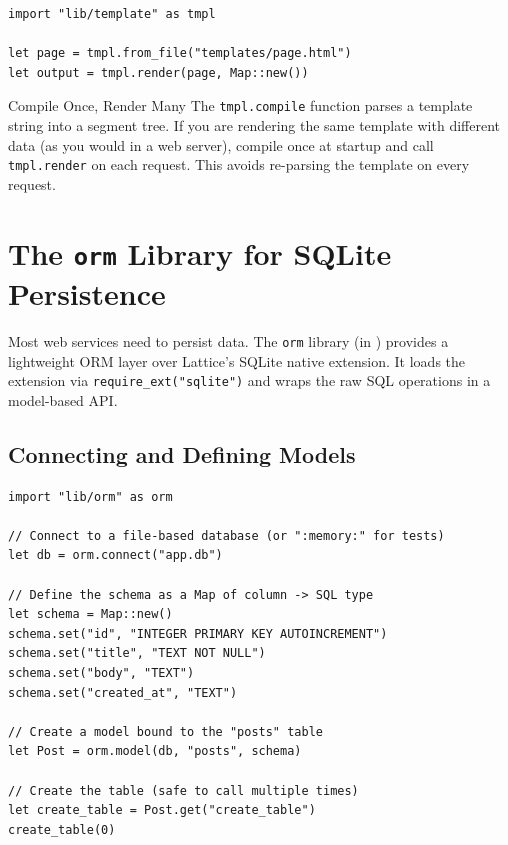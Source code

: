 \begin{lstlisting}[language=Lattice, caption={Rendering an inherited template}]
import "lib/template" as tmpl

let page = tmpl.from_file("templates/page.html")
let output = tmpl.render(page, Map::new())
\end{lstlisting}

\begin{tipbox}{Compile Once, Render Many}
The \lstinline|tmpl.compile| function parses a template string into a segment tree.
If you are rendering the same template with different data (as you would in a web server), compile once at startup and call \lstinline|tmpl.render| on each request.
This avoids re-parsing the template on every request.
\end{tipbox}

\section{The \texttt{orm} Library for SQLite Persistence}\label{sec:orm-library}


Most web services need to persist data.
The \lstinline|orm| library (in ) provides a lightweight ORM layer over Lattice's SQLite native extension.
It loads the extension via \lstinline|require_ext("sqlite")| and wraps the raw SQL operations in a model-based API.

\subsection{Connecting and Defining Models}\label{sec:orm-connect}

\begin{lstlisting}[language=Lattice, caption={Setting up a database and model}]
import "lib/orm" as orm

// Connect to a file-based database (or ":memory:" for tests)
let db = orm.connect("app.db")

// Define the schema as a Map of column -> SQL type
let schema = Map::new()
schema.set("id", "INTEGER PRIMARY KEY AUTOINCREMENT")
schema.set("title", "TEXT NOT NULL")
schema.set("body", "TEXT")
schema.set("created_at", "TEXT")

// Create a model bound to the "posts" table
let Post = orm.model(db, "posts", schema)

// Create the table (safe to call multiple times)
let create_table = Post.get("create_table")
create_table(0)
\end{lstlisting}

